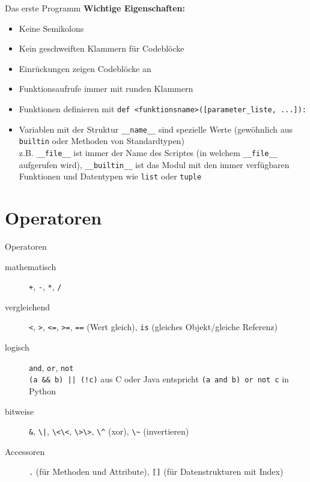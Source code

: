 \documentclass[]{tudbeamer}
\newcommand{\codeline}[1]{\colorbox{codegray}{\lstinline{#1}}}
\begin{document}
\begin{frame}[fragile]{Das erste Programm}
	\textbf{Wichtige Eigenschaften:}
	\begin{itemize}
	    \item Keine Semikolons
	    \item Kein geschweiften Klammern für Codeblöcke
	    \item Einrückungen zeigen Codeblöcke an
	    \item Funktionsaufrufe immer mit runden Klammern
	    \item Funktionen definieren mit \codeline{def <funktionsname>([parameter_liste, ...]):}
	    \item Variablen mit der Struktur \codeline{__name__} sind spezielle Werte (gewöhnlich aus \codeline{builtin} oder Methoden von Standardtypen)\\
	      z.B. \codeline{__file__} ist immer der Name des Scriptes (in welchem \codeline{__file__} aufgerufen wird),  
	      \codeline{__builtin__} ist das Modul mit den immer verfügbaren Funktionen und Datentypen wie \codeline{list} oder \codeline{tuple}
	\end{itemize}
\end{frame}


\section{Operatoren}
\begin{frame}[fragile]{Operatoren}
	\begin{description}
	    \item[mathematisch] \codeline{+}, \codeline{-}, \codeline{*}, \codeline{/} 
	    \item[vergleichend] \codeline{<}, \codeline{>}, \codeline{<=}, \codeline{>=}, \codeline{==} (Wert gleich), \codeline{is} (gleiches Objekt/gleiche Referenz)
	    \item[logisch] \codeline{and}, \codeline{or}, \codeline{not}\\ \codeline{(a && b) || (!c)} aus C oder Java entspricht \codeline{(a and b) or not c} in Python
	    \item[bitweise] \codeline{&}, \codeline{\|}, \codeline{\<\<}, \codeline{\>\>}, \codeline{\^} (xor), \codeline{\~} (invertieren)
	    \item[Accessoren] \codeline{.} (für Methoden und Attribute), \codeline{[]} (für Datenstrukturen mit Index)
	\end{description}
\end{frame}
\end{document}
